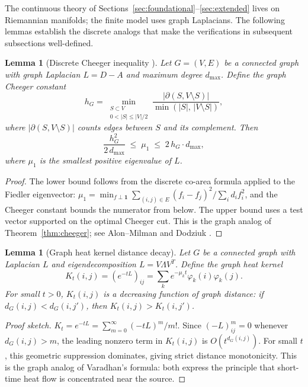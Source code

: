 \documentclass[11pt]{article}
\newtheorem{lemma}[theorem]{Lemma}
\theoremstyle{definition}
\theoremstyle{remark}
\begin{document}
The continuous theory of Sections~\ref{sec:foundational}--\ref{sec:extended} lives on Riemannian manifolds; the finite model uses graph Laplacians. The following lemmas establish the discrete analogs that make the verifications in subsequent subsections well-defined.

\begin{lemma}[Discrete Cheeger inequality {\cite{AlonMilman, Dodziuk}}]\label{lem:graph_cheeger}
Let $G = (V, E)$ be a connected graph with graph Laplacian $L = D - A$ and maximum degree $d_{\max}$. Define the graph Cheeger constant
\[
h_G = \min_{\substack{S \subset V \\ 0 < |S| \le |V|/2}} \frac{|\partial(S, V\setminus S)|}{\min(|S|,\, |V\setminus S|)},
\]
where $|\partial(S, V\setminus S)|$ counts edges between $S$ and its complement. Then
\[
\frac{h_G^2}{2\,d_{\max}} \;\le\; \mu_1 \;\le\; 2\,h_G\cdot d_{\max},
\]
where $\mu_1$ is the smallest positive eigenvalue of $L$.
\end{lemma}

\begin{proof}
The lower bound follows from the discrete co-area formula applied to the Fiedler eigenvector: $\mu_1 = \min_{f \perp \mathbf{1}} \sum_{(i,j)\in E}(f_i - f_j)^2/\sum_i d_i f_i^2$, and the Cheeger constant bounds the numerator from below. The upper bound uses a test vector supported on the optimal Cheeger cut. This is the graph analog of Theorem~\ref{thm:cheeger}; see Alon--Milman \cite{AlonMilman} and Dodziuk \cite{Dodziuk}.
\end{proof}

\begin{lemma}[Graph heat kernel distance decay]\label{lem:graph_varadhan}
Let $G$ be a connected graph with Laplacian $L$ and eigendecomposition $L = V\Lambda V^T$. Define the graph heat kernel
\[
K_t(i,j) = (e^{-tL})_{ij} = \sum_k e^{-\mu_k t}\varphi_k(i)\varphi_k(j).
\]
For small $t > 0$, $K_t(i,j)$ is a decreasing function of graph distance: if $d_G(i,j) < d_G(i,j')$, then $K_t(i,j) > K_t(i,j')$.
\end{lemma}

\begin{proof}[Proof sketch]
$K_t = e^{-tL} = \sum_{m=0}^\infty (-tL)^m/m!$. Since $(-L)^m_{ij} = 0$ whenever $d_G(i,j) > m$, the leading nonzero term in $K_t(i,j)$ is $O(t^{d_G(i,j)})$. For small $t$, this geometric suppression dominates, giving strict distance monotonicity. This is the graph analog of Varadhan's formula: both express the principle that short-time heat flow is concentrated near the source.
\end{proof}
\end{document}
